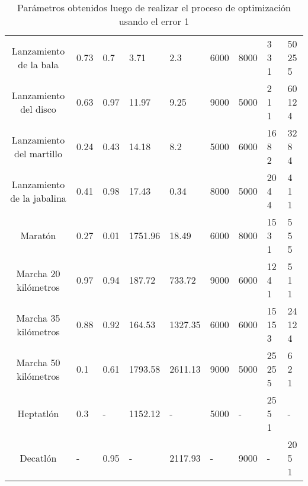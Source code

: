 \begin{anexos}
\begin{table}[H]
{\begin{tabular}{|c|P{1.3cm}|P{1.2cm}|P{1.3cm}|P{1.2cm}|P{1.4cm}|P{1.2cm}|P{2cm}|P{1.5cm}|}
            Lanzamiento de la bala & 0.73 & 0.7 & 3.71 & 2.3 & 6000 & 8000 & 3 3 1 & 50 25 5 \\
            Lanzamiento del disco & 0.63 & 0.97 & 11.97 & 9.25 & 9000 & 5000 & 2 1 1 & 60 12 4 \\
            Lanzamiento del martillo & 0.24 & 0.43 & 14.18 & 8.2 & 5000 & 6000 & 16 8 2 & 32 8 4 \\
            Lanzamiento de la jabalina & 0.41 & 0.98 & 17.43 & 0.34 & 8000 & 5000 & 20 4 4 & 4 1 1 \\
            Maratón & 0.27 & 0.01 & 1751.96 & 18.49 & 6000 & 8000 & 15 3 1 & 5 5 5 \\
            Marcha 20 kilómetros & 0.97 & 0.94 & 187.72 & 733.72 & 9000 & 6000 & 12 4 1 & 5 1 1 \\
            Marcha 35 kilómetros & 0.88 & 0.92 & 164.53 & 1327.35 & 6000 & 6000 & 15 15 3 & 24 12 4 \\
            Marcha 50 kilómetros & 0.1 & 0.61 & 1793.58 & 2611.13 & 9000 & 5000 & 25 25 5 & 6 2 1 \\
            Heptatlón & 0.3 & - & 1152.12 & - & 5000 & - & 25 5 1 & - \\
            Decatlón & - & 0.95 & - & 2117.93 & - & 9000 & - & 20 5 1 \\
            \hline
        \end{tabular}
        \caption{Parámetros obtenidos luego de realizar el proceso de optimización usando el error 1}
        \label{tab:paramserror1}
    }
\end{table}


\end{anexos}
